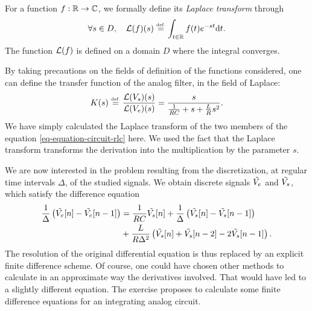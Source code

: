 \begin{defn}
  \label{notation-62} For a function $ f: \mathbb{R} \rightarrow \mathbb{C} $, we formally define its \textit{Laplace transform } through
\begin{equation*}
\forall s \in D, \quad \mathcal{L}(f) (s) \stackrel{\mbox{\upshape\tiny def.}}{=} \int_{t \in \mathbb{R}}{f(t) e^{- st} \mathrm{d} t}.
\end{equation*}
The function $ \mathcal{L}(f) $ is defined on a domain $ D $ where the integral converges.
\end{defn}
By taking precautions on the fields of definition of the functions considered, one can define the transfer function of the analog filter, in the field of Laplace:
\begin{equation*}
K (s) \stackrel{\mbox{\upshape\tiny def.}}{=} \frac{\mathcal{L}(V_s) (s)}{\mathcal{L}(V_e) (s)} = \frac{s}{\frac{1}{RC} + s + \frac{L }{R} s^2}.
\end{equation*}
We have simply calculated the Laplace transform of the two members of the equation \eqref{eq-equation-circuit-rlc} here. We used the fact that the Laplace transform transforms the derivation into the multiplication by the parameter $ s $.
 
 
We are now interested in the problem resulting from the discretization, at regular time intervals $ \Delta $, of the studied signals. We obtain discrete signals $ \tilde{V_e} $ and $ \tilde{V_s} $, which satisfy the difference equation
\begin{align*}
\frac{1}{\Delta} \left(\tilde{V_e}[n] - \tilde{V_e}[n-1] \right) & = \frac{1}{RC} \tilde{V_s}[ n] + \frac{1}{\Delta} \left(\tilde{V_s}[n] - \tilde{V_s}[n-1] \right) \\
& + \frac{L}{R \Delta^2} \left(\tilde{V_s}[n] + \tilde{V_s}[n-2] - 2 \tilde{V_s}[n-1] \right).
\end{align*}
The resolution of the original differential equation is thus replaced by an explicit finite difference scheme. Of course, one could have chosen other methods to calculate in an approximate way the derivatives involved. That would have led to a slightly different equation. The exercise  proposes to calculate some finite difference equations for an integrating analog circuit.
 
